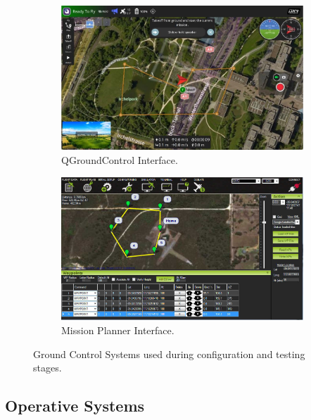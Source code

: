 \begin{figure}[H]
    \centering
    \begin{subfigure}{0.48\textwidth}
        \centering
        \includegraphics[width=\textwidth]{pictures/qgc_interface.jpg} %
        \caption{QGroundControl Interface.}
        \label{fig:qgc}
    \end{subfigure}
    \hfill
    \begin{subfigure}{0.48\textwidth}
        \centering
        \includegraphics[width=\textwidth]{pictures/mission_planner.jpg} %
        \caption{Mission Planner Interface.}
        \label{fig:mission_planner}
    \end{subfigure}
    \caption{Ground Control Systems used during configuration and testing stages.}
    \label{fig:gcs}
\end{figure}



\subsection{Operative Systems} 

